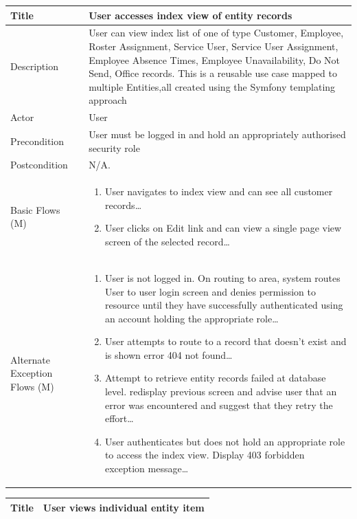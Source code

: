 \documentclass[a4paper,12pt]{article}
\newcommand\addrow[2]{#1 &#2\\ }
\newcommand\addheading[2]{#1 &#2\\ \hline}
\newcommand\tabularhead{\begin{tabular}{lp{11cm}}
\hline
}
\newcommand\addmulrow[2]{ \begin{minipage}[t][][t]{3cm}#1\end{minipage}%
   &\begin{minipage}[t][][t]{11cm}
    \begin{enumerate} #2   \end{enumerate}
    \end{minipage}\\ }
\newenvironment{usecase}{\tabularhead}
{\hline\end{tabular}}
\begin{document}
\begin{samepage}
\begin{usecase}

    \addheading{Title}{User accesses index view of entity records }
  \addheading{Description}{User can view index list of one of type Customer, Employee, Roster Assignment, Service User, Service User Assignment, Employee Absence Times, Employee Unavailability, Do Not Send, Office records. This is a reusable use case mapped to multiple Entities,all created using the Symfony templating approach}
  \addheading{Actor}{User} 
  \addrow{Precondition}{User must be logged in and hold an appropriately authorised security role}
  \addrow{Postcondition}{N/A.}
  \addmulrow{Basic Flows (M)}{\item User navigates to index view and can see all customer records\ldots
                                  \item User clicks on Edit link and can view a single page view screen of the selected record\ldots}
  \addmulrow{Alternate Exception Flows (M)}{\item User is not logged in. On routing to area, system routes User to user login screen and denies permission to resource until they have successfully authenticated using an account holding the appropriate  role\ldots
                                   \item User attempts to route to a record that doesn't exist and is shown error 404 not found\ldots
                                   \item Attempt to retrieve entity records failed at database level. redisplay previous screen and advise user that an error was encountered and suggest that they retry the effort\ldots
                                   \item User authenticates but does not hold an appropriate role to access the index view. Display 403 forbidden exception message\ldots}

\end{usecase}

\begin{usecase}
    \addheading{Title}{User views individual entity item}


\end{usecase}
\end{samepage}
\end{document}
